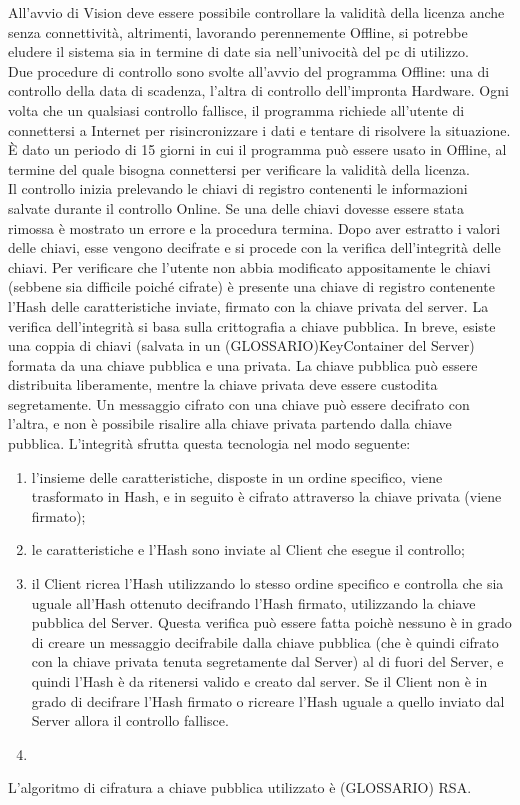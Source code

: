 All'avvio di Vision deve essere possibile controllare la validità della licenza anche senza connettività, altrimenti, lavorando perennemente Offline, si potrebbe eludere il sistema sia in termine di date sia nell'univocità del pc di utilizzo.\\
Due procedure di controllo sono svolte all'avvio del programma Offline: una di controllo della data di scadenza, l'altra di controllo dell'impronta Hardware. Ogni volta che un qualsiasi controllo fallisce, il programma richiede all'utente di connettersi a Internet per risincronizzare i dati e tentare di risolvere la situazione. È dato un periodo di 15 giorni in cui il programma può essere usato in Offline, al termine del quale bisogna connettersi per verificare la validità della licenza.\\
Il controllo inizia prelevando le chiavi di registro contenenti le informazioni salvate durante il controllo Online. Se una delle chiavi dovesse essere stata rimossa è mostrato un errore e la procedura termina. Dopo aver estratto i valori delle chiavi, esse vengono decifrate e si procede con la verifica dell’integrità delle chiavi. Per verificare che l’utente non abbia modificato appositamente le chiavi (sebbene sia difficile poiché cifrate) è presente una chiave di registro contenente l’Hash delle caratteristiche inviate, firmato con la chiave privata del server.
La verifica dell'integrità si basa sulla crittografia a chiave pubblica. In breve, esiste una coppia di chiavi (salvata in un (GLOSSARIO)KeyContainer del Server) formata da una chiave pubblica e una privata. La chiave pubblica può essere distribuita liberamente, mentre la chiave privata deve essere custodita segretamente. Un messaggio cifrato con una chiave può essere decifrato con l'altra, e non è possibile risalire alla chiave privata partendo dalla chiave pubblica. L'integrità sfrutta questa tecnologia nel modo seguente:
\begin{enumerate}
\item l'insieme delle caratteristiche, disposte in un ordine specifico, viene trasformato in Hash, e in seguito è cifrato attraverso la chiave privata (viene firmato);
\item le caratteristiche e l'Hash sono inviate al Client che esegue il controllo;
\item il Client ricrea l'Hash utilizzando lo stesso ordine specifico e controlla che sia uguale all'Hash ottenuto decifrando l'Hash firmato, utilizzando la chiave pubblica del Server. Questa verifica può essere fatta poichè nessuno è in grado di creare un messaggio decifrabile dalla chiave pubblica (che è quindi cifrato con la chiave privata tenuta segretamente dal Server) al di fuori del Server, e quindi l'Hash è da ritenersi valido e creato dal server. Se il Client non è in grado di decifrare l'Hash firmato o ricreare l'Hash uguale a quello inviato dal Server allora il controllo fallisce.
\item   
\end{enumerate}
L'algoritmo di cifratura a chiave pubblica utilizzato è (GLOSSARIO) RSA.

